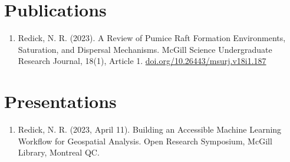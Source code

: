 \documentclass[a4paper,10pt]{article}
\begin{document}
\section{Publications}
\spaceaftersections
\begin{enumerate}
    \item Redick, N. R. (2023). A Review of Pumice Raft Formation Environments, Saturation, and Dispersal Mechanisms. McGill Science Undergraduate Research Journal, 18(1), Article 1. \href{https://doi.org/10.26443/msurj.v18i1.187}{doi.org/10.26443/msurj.v18i1.187}
\end{enumerate}
\spaceaftersections
\spaceaftersections

\section{Presentations}
\spaceaftersections
\begin{enumerate}
    \item Redick, N. R. (2023, April 11). Building an Accessible Machine Learning Workflow for Geospatial Analysis. Open Research Symposium, McGill Library, Montreal QC.
\end{enumerate}
\spaceaftersections


\vfill
\center{\footnotesize \textcolor[HTML]{666666}{Last updated: \today}}
\end{document}
